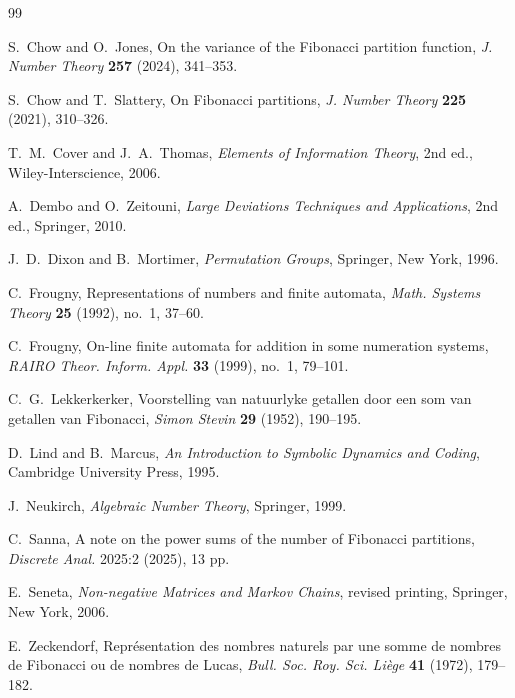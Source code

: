 \begin{thebibliography}{99}

S.~Chow and O.~Jones,
On the variance of the Fibonacci partition function,
\textit{J. Number Theory} \textbf{257} (2024), 341--353.

S.~Chow and T.~Slattery,
On Fibonacci partitions,
\textit{J. Number Theory} \textbf{225} (2021), 310--326.

T.~M.~Cover and J.~A.~Thomas,
\textit{Elements of Information Theory},
2nd ed., Wiley-Interscience, 2006.

A.~Dembo and O.~Zeitouni,
\textit{Large Deviations Techniques and Applications},
2nd ed., Springer, 2010.

J.~D.~Dixon and B.~Mortimer,
\textit{Permutation Groups},
Springer, New York, 1996.

C.~Frougny,
Representations of numbers and finite automata,
\textit{Math. Systems Theory} \textbf{25} (1992), no.~1, 37--60.

C.~Frougny,
On-line finite automata for addition in some numeration systems,
\textit{RAIRO Theor. Inform. Appl.} \textbf{33} (1999), no.~1, 79--101.

C.~G.~Lekkerkerker,
Voorstelling van natuurlyke getallen door een som van getallen van Fibonacci,
\textit{Simon Stevin} \textbf{29} (1952), 190--195.

D.~Lind and B.~Marcus,
\textit{An Introduction to Symbolic Dynamics and Coding},
Cambridge University Press, 1995.

J.~Neukirch,
\textit{Algebraic Number Theory},
Springer, 1999.

C.~Sanna,
A note on the power sums of the number of Fibonacci partitions,
\textit{Discrete Anal.} 2025:2 (2025), 13 pp.

E.~Seneta,
\textit{Non-negative Matrices and Markov Chains},
revised printing, Springer, New York, 2006.

E.~Zeckendorf,
Repr\'esentation des nombres naturels par une somme de nombres de Fibonacci ou
de nombres de Lucas,
\textit{Bull. Soc. Roy. Sci. Li\`ege} \textbf{41} (1972), 179--182.

\end{thebibliography}
